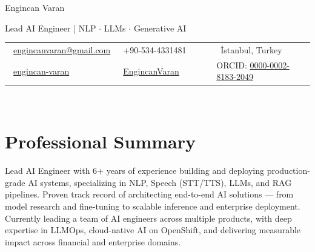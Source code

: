 \documentclass[a4paper,10pt]{article}
\newcommand{\name}[1]{\Huge\scshape\raggedright #1 \\ \vspace{0.1cm}}
\newcommand{\tagline}[1]{\large\bfseries\raggedright #1 \\ \vspace{0.2cm}}
\newcommand{\personalinfo}[1]{\normalsize\raggedright #1 \\ \vspace{0.1cm}}
\begin{document}
\begin{center}
    \name{Engincan Varan}
    \tagline{Lead AI Engineer | NLP $\cdot$ LLMs $\cdot$ Generative AI}
    \personalinfo{
        \begin{tabular}{>{\raggedright}p{0.33\linewidth} >{\centering}p{0.33\linewidth} >{\raggedleft\arraybackslash}p{0.34\linewidth}}
            \faEnvelope \ \href{mailto:engincanvaran@gmail.com}{engincanvaran@gmail.com} & 
            \faPhone \ +90-534-4331481 & 
            \faMapMarker \ İstanbul, Turkey \\
            \faLinkedin \ \href{https://www.linkedin.com/in/engincan-varan}{engincan-varan} & 
            \faGithub \ \href{https://github.com/EngincanVaran}{EngincanVaran} & 
            ORCID: \href{https://orcid.org/0000-0002-8183-2049}{0000-0002-8183-2049}
        \end{tabular}
    }
\end{center}

\vspace{-0.5cm}
\section{Professional Summary}
Lead AI Engineer with 6+ years of experience building and deploying production-grade AI systems, specializing in NLP, Speech (STT/TTS), LLMs, and RAG pipelines. Proven track record of architecting end-to-end AI solutions --- from model research and fine-tuning to scalable inference and enterprise deployment. Currently leading a team of AI engineers across multiple products, with deep expertise in LLMOps, cloud-native AI on OpenShift, and delivering measurable impact across financial and enterprise domains.

\vspace{-0.5cm}
\end{document}
